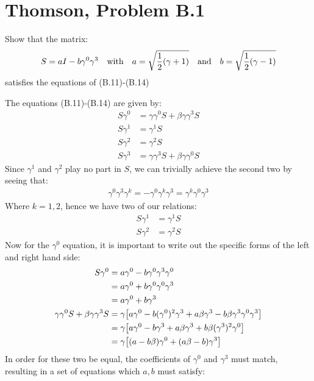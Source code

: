 \documentclass[12pt]{article}
\begin{document}
\section{Thomson, Problem B.1}
\begin{problem}
  Show that the matrix:
  \begin{align*}
    S=aI-b\gamma^0\gamma^3\quad\text{with}\quad a=\sqrt{\frac12\qty(\gamma+1)}\quad\text{and}\quad b=\sqrt{\frac12\qty(\gamma-1)}
  \end{align*}
  satisfies the equations of (B.11)-(B.14)
\end{problem}
The equations (B.11)-(B.14) are given by:
\begin{align*}
  S\gamma^0&=\gamma\gamma^0 S+\beta\gamma\gamma^3S\\
  S\gamma^1&=\gamma^1 S\\
  S\gamma^2&=\gamma^2 S\\
  S\gamma^3&=\gamma\gamma^3 S+\beta\gamma\gamma^0S
\end{align*}
Since $\gamma^1$ and $\gamma^2$ play no part in $S$, we can trivially achieve the second two by seeing that:
\begin{align*}
  \gamma^0\gamma^3\gamma^k=-\gamma^0\gamma^k\gamma^3=\gamma^k\gamma^0\gamma^3
\end{align*}
Where $k=1,2$, hence we have two of our relations:
\begin{equation}
  \label{eq:p9a}
  \boxed{
    \begin{aligned}
      S\gamma^1&=\gamma^1 S\\
      S\gamma^2&=\gamma^2 S
    \end{aligned}
  }
\end{equation}
Now for the $\gamma^0$ equation, it is important to write out the specific forms of the left and right hand side:
\begin{align*}
  S\gamma^0&=a\gamma^0-b\gamma^0\gamma^3\gamma^0\\
  &=a\gamma^0+b\gamma^0\gamma^0\gamma^3\\
  &=a\gamma^0+b\gamma^3\\
  \gamma\gamma^0 S+\beta\gamma\gamma^3S&=
  \gamma\qty[a\gamma^0-b(\gamma^0)^2\gamma^3
  +a\beta\gamma^3-b\beta\gamma^3\gamma^0\gamma^3]\\
  &=\gamma\qty[a\gamma^0-b\gamma^3
  +a\beta\gamma^3+b\beta(\gamma^3)^2\gamma^0]\\
  &=\gamma\qty[(a-b\beta)\gamma^0+(a\beta-b)\gamma^3]
\end{align*}
In order for these two be equal, the coefficients of $\gamma^0$ and $\gamma^3$ must match, resulting in a set of equations which $a,b$ must satisfy:
\end{document}
